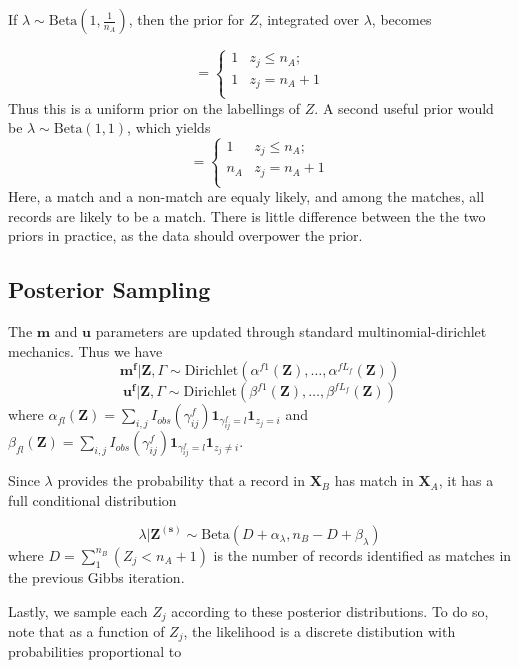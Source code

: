 \documentclass[
  12pt,
]{article}
\begin{document}
If \(\lambda \sim \text{Beta}(1, \frac{1}{n_A})\), then the prior for
\(Z\), integrated over \(\lambda\), becomes

\[=\begin{cases} 
    1  & z_j \leq n_A; \\
    1 &  z_j  = n_A + 1 \\
\end{cases}\] Thus this is a uniform prior on the labellings of \(Z\). A
second useful prior would be \(\lambda \sim \text{Beta}(1, 1)\), which
yields \[=\begin{cases} 
    1  & z_j \leq n_A; \\
    n_A &  z_j  = n_A + 1 \\
\end{cases}\] Here, a match and a non-match are equaly likely, and among
the matches, all records are likely to be a match. There is little
difference between the the two priors in practice, as the data should
overpower the prior.

\hypertarget{posterior-sampling}{%
\subsection{Posterior Sampling}\label{posterior-sampling}}

The \(\mathbf{m}\) and \(\mathbf{u}\) parameters are updated through
standard multinomial-dirichlet mechanics. Thus we have
\[\mathbf{m^{f}}|\mathbf{Z}, \Gamma \sim \text{Dirichlet}(\alpha^{f1}(\mathbf{Z}), \ldots, \alpha^{fL_f}(\mathbf{Z}))\]
\[\mathbf{u^{f}}|\mathbf{Z}, \Gamma \sim \text{Dirichlet}(\beta^{f1}(\mathbf{Z}), \ldots, \beta^{fL_f}(\mathbf{Z}))\]
where
\(\alpha_{fl}(\mathbf{Z})= \sum_{i,j} I_{obs}(\gamma_{ij}^f)\mathbf{1}_{\gamma_{ij}^f = l} \mathbf{1}_{z_j = i}\)
and
\(\beta_{fl}(\mathbf{Z})= \sum_{i,j} I_{obs}(\gamma_{ij}^f)\mathbf{1}_{\gamma_{ij}^f = l} \mathbf{1}_{z_j \neq i}\).

Since \(\lambda\) provides the probability that a record in
\(\mathbf{X}_B\) has match in \(\mathbf{X}_A\), it has a full
conditional distribution

\[\lambda|\mathbf{Z^{(s)}} \sim \text{Beta}(D + \alpha_{\lambda}, n_B - D + \beta_{\lambda})\]
where \(D = \sum_1^{n_B} (Z_j < n_A + 1)\) is the number of records
identified as matches in the previous Gibbs iteration.

Lastly, we sample each \(Z_j\) according to these posterior
distributions. To do so, note that as a function of \(Z_j\), the
likelihood is a discrete distibution with probabilities proportional to
\end{document}
